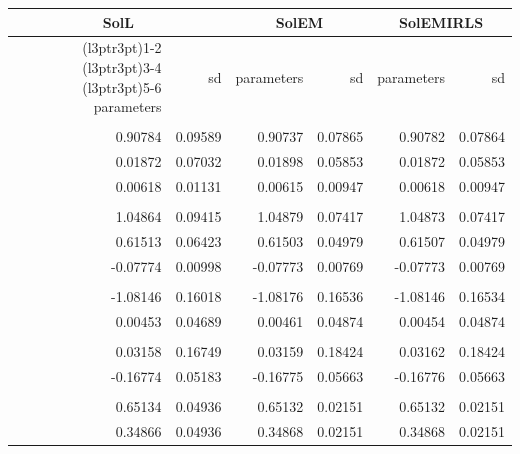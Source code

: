 \documentclass{article}\usepackage[]{graphicx}\usepackage[]{color}
\begin{document}
\begin{table}[H]
\centering
\begin{tabular}{rrrrrr}
\toprule
\multicolumn{2}{c}{SolL} & \multicolumn{2}{c}{SolEM} & \multicolumn{2}{c}{SolEMIRLS} \\
\cmidrule(l{3pt}r{3pt}){1-2} \cmidrule(l{3pt}r{3pt}){3-4} \cmidrule(l{3pt}r{3pt}){5-6}
parameters & sd & parameters & sd & parameters & sd\\
\midrule
\addlinespace[0.3em]
\multicolumn{6}{l}{\textbf{Beta 1}}\\
\hspace{1em}0.90784 & 0.09589 & 0.90737 & 0.07865 & 0.90782 & 0.07864\\
\hspace{1em}0.01872 & 0.07032 & 0.01898 & 0.05853 & 0.01872 & 0.05853\\
\hspace{1em}0.00618 & 0.01131 & 0.00615 & 0.00947 & 0.00618 & 0.00947\\
\addlinespace[0.3em]
\multicolumn{6}{l}{\textbf{Beta 2}}\\
\hspace{1em}1.04864 & 0.09415 & 1.04879 & 0.07417 & 1.04873 & 0.07417\\
\hspace{1em}0.61513 & 0.06423 & 0.61503 & 0.04979 & 0.61507 & 0.04979\\
\hspace{1em}-0.07774 & 0.00998 & -0.07773 & 0.00769 & -0.07773 & 0.00769\\
\addlinespace[0.3em]
\multicolumn{6}{l}{\textbf{Nu 1}}\\
\hspace{1em}-1.08146 & 0.16018 & -1.08176 & 0.16536 & -1.08146 & 0.16534\\
\hspace{1em}0.00453 & 0.04689 & 0.00461 & 0.04874 & 0.00454 & 0.04874\\
\addlinespace[0.3em]
\multicolumn{6}{l}{\textbf{Nu 2}}\\
\hspace{1em}0.03158 & 0.16749 & 0.03159 & 0.18424 & 0.03162 & 0.18424\\
\hspace{1em}-0.16774 & 0.05183 & -0.16775 & 0.05663 & -0.16776 & 0.05663\\
\addlinespace[0.3em]
\multicolumn{6}{l}{\textbf{Pi}}\\
\hspace{1em}0.65134 & 0.04936 & 0.65132 & 0.02151 & 0.65132 & 0.02151\\
\hspace{1em}0.34866 & 0.04936 & 0.34868 & 0.02151 & 0.34868 & 0.02151\\
\bottomrule
\end{tabular}
\end{table}
\end{document}
